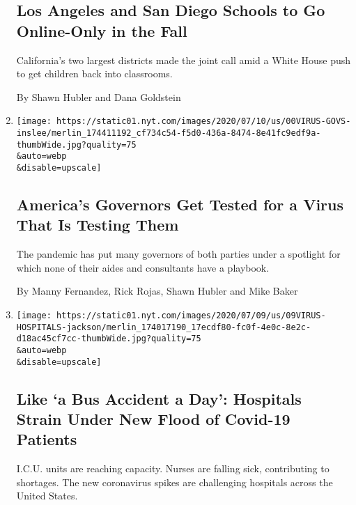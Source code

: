 \begin{enumerate}
{  \subsection{Los Angeles and San Diego Schools to Go Online-Only in the
  Fall}\label{los-angeles-and-san-diego-schools-to-go-online-only-in-the-fall}}

  California's two largest districts made the joint call amid a White
  House push to get children back into classrooms.

  By Shawn Hubler and Dana Goldstein
\item
  \href{/2020/07/13/us/coronavirus-governors.html}{}

  \texttt{[image: https://static01.nyt.com/images/2020/07/10/us/00VIRUS-GOVS-inslee/merlin\_174411192\_cf734c54-f5d0-436a-8474-8e41fc9edf9a-thumbWide.jpg?quality=75\\\&auto=webp\\\&disable=upscale]}

  \hypertarget{americas-governors-get-tested-for-a-virus-that-is-testing-them}{%
  \subsection{America's Governors Get Tested for a Virus That Is Testing
  Them}\label{americas-governors-get-tested-for-a-virus-that-is-testing-them}}

  The pandemic has put many governors of both parties under a spotlight
  for which none of their aides and consultants have a playbook.

  By Manny Fernandez, Rick Rojas, Shawn Hubler and Mike Baker
\item
  \href{/2020/07/09/us/coronavirus-hospitals-capacity.html}{}

  \texttt{[image: https://static01.nyt.com/images/2020/07/09/us/09VIRUS-HOSPITALS-jackson/merlin\_174017190\_17ecdf80-fc0f-4e0c-8e2c-d18ac45cf7cc-thumbWide.jpg?quality=75\\\&auto=webp\\\&disable=upscale]}

  \hypertarget{like-a-bus-accident-a-day-hospitals-strain-under-new-flood-of-covid-19-patients}{%
  \subsection{Like `a Bus Accident a Day': Hospitals Strain Under New
  Flood of Covid-19
  Patients}\label{like-a-bus-accident-a-day-hospitals-strain-under-new-flood-of-covid-19-patients}}

  I.C.U. units are reaching capacity. Nurses are falling sick,
  contributing to shortages. The new coronavirus spikes are challenging
  hospitals across the United States.


\end{enumerate}
